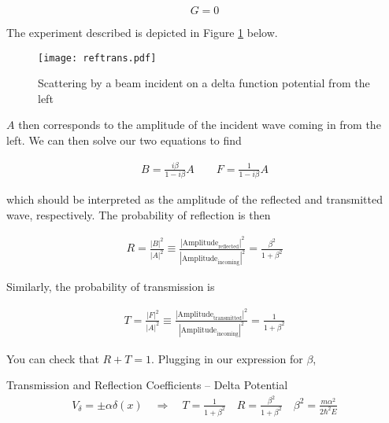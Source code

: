  \[
G=0
\] \vspace{3px}

The experiment described is depicted in Figure \ref{reftrans} below. 


\begin{figure}[H]
  \centering
    \texttt{[image: reftrans.pdf]}
    \caption{Scattering by a beam incident on a delta function potential from
    the left} 
    \label{reftrans}
\end{figure}


$A$ then corresponds to the amplitude of the incident wave coming in from the
left. We can then solve our two equations to find 

\begin{align} \label{}
  B = \frac{i\beta}{1 - i\beta}A \qquad F = \frac{1}{1-i\beta}A
\end{align}\vspace{3px}

which should be interpreted as the amplitude of the reflected and transmitted
wave, respectively. The probability of reflection is then 

\begin{align} \label{}
  R = \frac{|B|^2}{|A|^2} \equiv
  \frac{|\text{Amplitude}_\text{reflected}|^2}{|\text{Amplitude}_\text{incoming}
  |^2} = \frac{\beta^2}{1 + \beta^2}
\end{align}\vspace{3px}

Similarly, the probability of transmission is 

\begin{align} \label{}
  T = \frac{|F|^2}{|A|^2} \equiv \frac{|\text{Amplitude}_\text{transmitted}
  |^2}{|\text{Amplitude}_\text{incoming}|^2} = \frac{1}{1 + \beta^2}
\end{align}\vspace{3px}

You can check that $R + T = 1$. Plugging in our expression for $\beta$, 

\begin{subbox}{Transmission and Reflection Coefficients -- Delta Potential}
  \begin{align} \label{reftranscoeff}
    V_\delta = \pm \alpha \delta(x) \quad \Rightarrow \quad T = \frac{1}{1
    + \beta^2} \quad R = \frac{\beta^2}{1 + \beta^2} \quad \beta^2
    = \frac{m\alpha^2}{2\hbar^2 E}
  \end{align}\vspace{3px}
\end{subbox}

